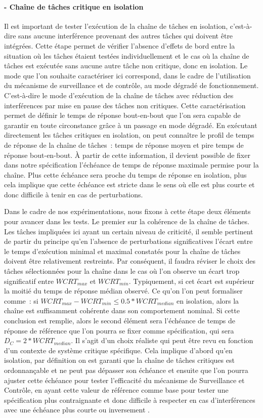 \documentclass[french, a4paper, 11pt, twoside, pdftex]{StyleThese}
\begin{document}
		\paragraph{ - Chaîne de tâches critique en isolation}
		Il est important de tester l'exécution de la chaîne de tâches en isolation, c'est-à-dire sans aucune interférence provenant des autres tâches qui doivent être intégrées. Cette étape permet de vérifier l'absence d'effets de bord entre la situation où les tâches étaient testées individuellement et le cas où la chaîne de tâches est exécutée sans aucune autre tâche non critique, donc en isolation. Le mode que l'on souhaite caractériser ici correspond, dans le cadre de l'utilisation du mécanisme de surveillance et de contrôle, au mode dégradé de fonctionnement. C'est-à-dire le mode d'exécution de la chaîne de tâches avec réduction des interférences par mise en pause des tâches non critiques. Cette caractérisation permet de définir le temps de réponse bout-en-bout que l'on sera capable de garantir en toute circonstance grâce à un passage en mode dégradé. En exécutant directement les tâches critiques en isolation, on peut connaître le profil de temps de réponse de la chaîne de tâches~: temps de réponse moyen et pire temps de réponse bout-en-bout. À partir de cette information, il devient possible de fixer dans notre spécification l'échéance de temps de réponse maximale permise pour la chaîne. Plus cette échéance sera proche du temps de réponse en isolation, plus cela implique que cette échéance est stricte dans le sens où elle est plus courte et donc difficile à tenir en cas de perturbations.
			
		Dans le cadre de nos expérimentations, nous fixons à cette étape deux éléments pour avancer dans les tests. Le premier sur la cohérence de la chaîne de tâches. Les tâches impliquées ici ayant un certain niveau de criticité, il semble pertinent de partir du principe qu'en l'absence de perturbations significatives l'écart entre le temps d'exécution minimal et maximal constatés pour la chaîne de tâches doivent être relativement restreints. Par conséquent, il faudra réviser le choix des tâches sélectionnées pour la chaîne dans le cas où l'on observe un écart trop significatif entre $ WCRT_{max} $ et $ WCRT_{min} $. Typiquement, si cet écart est supérieur la moitié du temps de réponse médian observé. Ce qu'on l'on peut formaliser comme~: si $ WCRT_{max} - WCRT_{min} \leq 0.5*WCRT_{median} $ en isolation, alors la chaîne est suffisamment cohérente dans son comportement nominal. 
		Si cette conclusion est remplie, alors le second élément sera l'échéance de temps de réponse de référence que l'on pourra se fixer comme spécification, qui sera $D_C = 2*WCRT_{median}$. Il s'agit d'un choix réaliste qui peut être revu en fonction d'un contexte de système critique spécifique. Cela implique d'abord qu'en isolation, par définition on est garanti que la chaîne de tâches critiques est ordonnançable et ne peut pas dépasser son échéance et ensuite que l'on pourra ajuster cette échéance pour tester l'efficacité du mécanisme de Surveillance et Contrôle, en ayant cette valeur de référence comme base pour tester une spécification plus contraignante et donc difficile à respecter en cas d'interférences avec une échéance plus courte ou inversement .
\end{document}

